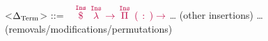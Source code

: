 \documentclass[preview]{standalone}
\begin{document}
\phantom{A}
\begin{grammar}
<$\DeltaTerm{}$> ::= \ %
\alt {}
\alt \synt{$\DeltaTerm{}$} $\textcolor{purple}{\overset{\mathtt{Ins}}{ \$ }}$ \synt{$\DeltaTerm{}$}
\alt $\textcolor{purple}{\overset{\mathtt{Ins}}{\lambda}}$  $\textcolor{purple}{\rightarrow}$ \synt{$\DeltaTerm{}$}
\alt $\textcolor{purple}{\overset{\mathtt{Ins}}{\Pi}}$ $\textcolor{purple}{(}$ $\textcolor{purple}{:}$ \synt{$\DeltaTerm{}$}$\textcolor{purple}{) \rightarrow}$
\synt{$\DeltaTerm{}$}
\alt … \hfill (other insertions)
\alt … \hfill (removals/modifications/permutations)
\end{grammar}
\phantom{A}
\end{document}
